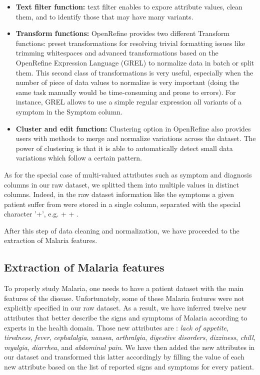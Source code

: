 \begin{itemize}
\item \textbf{Text filter function:} text filter enables to expore attribute values, clean them, and to identify those that may have many variants. 
\item \textbf{Transform functions:} OpenRefine provides two different Transform functions: preset transformations for resolving trivial formatting issues like trimming whitespaces
and advanced transformations based on the OpenRefine Expression Language (GREL) to normalize data in batch or split them. This second class of transformations is very useful, especially when the 
number of piece of data values to normalize is very important (doing the same task manually would be time-consuming and prone to errors). For instance, GREL allows to use a simple
regular expression all variants of a symptom in the Symptom column.  
\item \textbf{Cluster and edit function:} Clustering option in OpenRefine also provides users with methods to merge and normalize variations across the dataset. The power of clustering
is that it is able to automatically detect small data variations which follow a certain pattern.  
\end{itemize}

As for the special case of multi-valued attributes such as symptom and diagnosis columns in our raw dataset, we splitted them into multiple values in distinct columns.
Indeed, in the raw dataset information like the symptoms a given patient suffer from were stored in a single column, separated with the special character '+', e.g. 
+  + .


After this step of data cleaning and normalization, we have proceeded to the extraction of Malaria features.

\subsection{Extraction of Malaria features}
To properly study Malaria, one needs to have a patient dataset with the main features of the disease. 
Unfortunately, some of these Malaria features were not explicitly specified in our raw dataset.
As a result, we have inferred twelve new attributes that better describe the signs and symptoms 
of Malaria according to experts in the health domain. Those new attributes are : \emph{lack of appetite},
\emph{tiredness}, \emph{fever}, \emph{cephalalgia}, \emph{nausea}, \emph{arthralgia}, 
\emph{digestive disorders}, \emph{dizziness}, \emph{chill}, \emph{myalgia}, \emph{diarrhea}, and \emph{abdominal pain}.  
We have then added the new attributes in our dataset and transformed this latter accordingly by filling the value of each new attribute based on the 
list of reported signs and symptoms for every patient.

